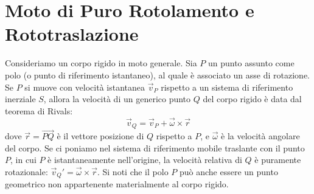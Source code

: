 \section{Moto di Puro Rotolamento e Rototraslazione}

Consideriamo un corpo rigido in moto generale. Sia $P$ un punto assunto come polo (o punto di riferimento istantaneo), al quale è associato un asse di rotazione. Se $P$ si muove con velocità istantanea $\vec{v}_P$ rispetto a un sistema di riferimento inerziale $S$, allora la velocità di un generico punto $Q$ del corpo rigido è data dal teorema di Rivals:
\begin{equation}
    \vec{v}_Q = \vec{v}_P + \vec{\omega} \times \vec{r}
\end{equation}
dove $\vec{r} = \overrightarrow{PQ}$ è il vettore posizione di $Q$ rispetto a $P$, e $\vec{\omega}$ è la velocità angolare del corpo. Se ci poniamo nel sistema di riferimento mobile traslante con il punto $P$, in cui $P$ è istantaneamente nell'origine, la velocità relativa di $Q$ è puramente rotazionale: $\vec{v}_Q' = \vec{\omega} \times \vec{r}$.
Si noti che il polo $P$ può anche essere un punto geometrico non appartenente materialmente al corpo rigido.

